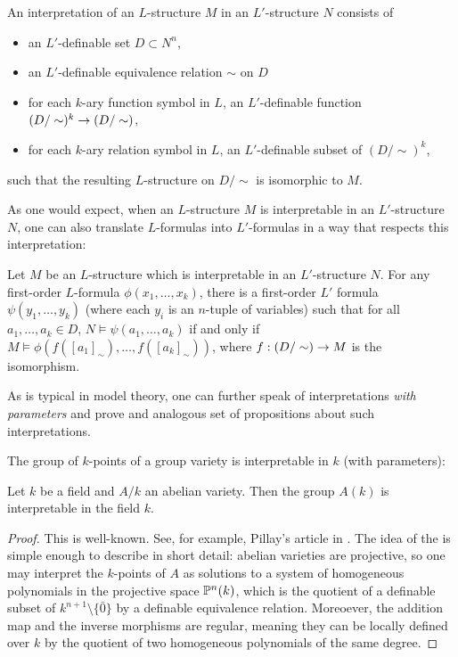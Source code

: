 \begin{definition}
An interpretation of an $L$-structure $M$ in an $L'$-structure $N$ consists of
\begin{itemize}
\item an $L'$-definable set $D\subset N^n$,
\item an $L'$-definable equivalence relation $\sim$ on $D$
\item for each $k$-ary function symbol in $L$, an $L'$-definable function $(D/\sim)^k\rightarrow (D/\sim)$,
\item for each $k$-ary relation symbol in $L$, an $L'$-definable subset of $(D/\sim)^k$,
\end{itemize}
such that the resulting $L$-structure on $D/\sim$ is isomorphic to $M$.
\end{definition}

As one would expect, when an $L$-structure $M$ is interpretable in an $L'$-structure $N$, one can also translate $L$-formulas into $L'$-formulas in a way that respects this interpretation:

\begin{proposition}
Let $M$ be an $L$-structure which is interpretable in an $L'$-structure $N$. For any first-order $L$-formula $\phi(x_1,\dots, x_k)$, there is a first-order $L'$ formula $\psi(y_1,\dots, y_k)$ (where each $y_i$ is an $n$-tuple of variables) such that for all $a_1,\dots, a_k\in D$, $N\models \psi(a_1,\dots, a_k)$ if and only if $M\models \phi(f([a_1]_{\sim}), \dots, f([a_k]_{\sim}))$, where $f:(D/\sim)\rightarrow M$ is the isomorphism.
\end{proposition}

As is typical in model theory, one can further speak of interpretations \emph{with parameters} and prove and analogous set of propositions about such interpretations. 

The group of $k$-points of a group variety is interpretable in $k$ (with parameters):

\begin{proposition}
Let $k$ be a field and $A/k$ an abelian variety. Then the group $A(k)$ is interpretable in the field $k$.
\end{proposition}
\begin{proof}
This is well-known. See, for example, Pillay's article in \cite{bouscaren2009model}. The idea of the is simple enough to describe in short detail: abelian varieties are projective, so one may interpret the $k$-points of $A$ as solutions to a system of homogeneous polynomials in the projective space $\mathbb{P}^n(k)$, which is the quotient of a definable subset of $k^{n+1}\setminus\{\bar{0}\}$ by a definable equivalence relation. Moreoever, the addition map and the inverse morphisms are regular, meaning they can be locally defined over $k$ by the quotient of two homogeneous polynomials of the same degree.
\end{proof}

